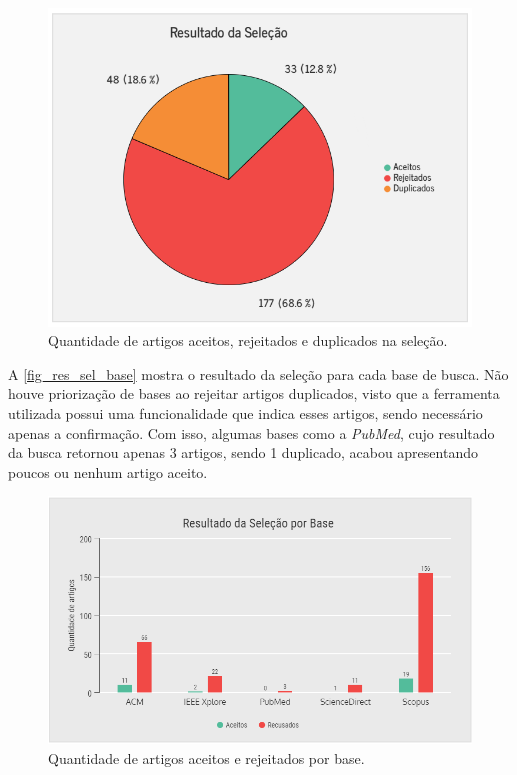 \begin{figure}[htb]
  \caption{\label{fig_res_sel}Quantidade de artigos aceitos, rejeitados e duplicados na seleção.}
  \begin{center}
    \includegraphics[scale=0.7]{Imagens/msl/resultado_selecao.png}
  \end{center}
\end{figure}

A \autoref{fig_res_sel_base} mostra o resultado da seleção para cada base de busca.
Não houve priorização de bases ao rejeitar artigos duplicados, visto que a ferramenta utilizada possui uma funcionalidade que indica esses artigos, sendo necessário apenas a confirmação.
Com isso, algumas bases como a \emph{PubMed}, cujo resultado da busca retornou apenas 3 artigos, sendo 1 duplicado, acabou apresentando poucos ou nenhum artigo aceito.

\begin{figure}[htb]
  \caption{\label{fig_res_sel_base}Quantidade de artigos aceitos e rejeitados por base.}
  \begin{center}
    \includegraphics[scale=0.6]{Imagens/msl/resultado_selecao_base.png}
  \end{center}
\end{figure}


